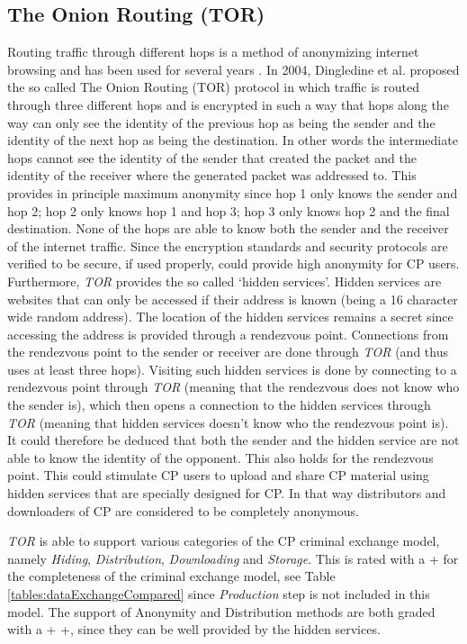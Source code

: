 \documentclass{sig-alternate-br}
\begin{document}
\subsection{The Onion Routing (TOR)}
Routing traffic through different hops is a method of anony\-mizing internet browsing and has been used for several years \cite{patil1963high}. In 2004, Dingledine et al. \cite{dingledine2004tor} proposed the so called The Onion Routing (TOR) protocol in which traffic is routed through three different hops and is encrypted in such a way that hops along the way can only see the identity of the previous hop as being the sender and the identity of the next hop as being the destination. In other words the intermediate hops cannot see the identity of the sender that created the packet and the identity of the receiver where the generated packet was addressed to. This provides in principle maximum anonymity since hop 1 only knows the sender and hop 2; hop 2 only knows hop 1 and hop 3; hop 3 only knows hop 2 and the final destination. None of the hops are able to know both the sender and the receiver of the internet traffic. Since the encryption standards and security protocols are verified \cite{goldberg2006security} to be secure, if used properly, could provide high anonymity for CP users. Furthermore, \textit{TOR} provides the so called `hidden services'. Hidden services are websites that can only be accessed if their address is known (being a 16 character wide random address). The location of the hidden services remains a secret since accessing the address is provided through a rendezvous point. Connections from the rendezvous point to the sender or receiver are done through \textit{TOR} (and thus uses at least three hops). Visiting such hidden services is done by connecting to a rendezvous point through \textit{TOR} (meaning that the rendezvous does not know who the sender is), which then opens a connection to the hidden services through \textit{TOR} (meaning that hidden services doesn't know who the rendezvous point is). It could therefore be deduced that both the sender and the hidden service are not able to know the identity of the opponent. This also holds for the rendezvous point. This could stimulate CP users to upload and share CP material using hidden services that are specially designed for CP. In that way distributors and downloaders of CP are considered to be completely anonymous.

\textit{TOR} is able to support various categories of the CP criminal exchange model, namely \textit{Hiding}, \textit{Distribution}, \textit{Downloading} and \textit{Storage}. This is rated with a + for the completeness of the criminal exchange model, see Table \ref{tables:dataExchangeCompared} since \textit{Production} step is not included in this model. The support of Anonymity and Distribution methods are both graded with a + +, since they can be well provided by the hidden services.
\end{document}
